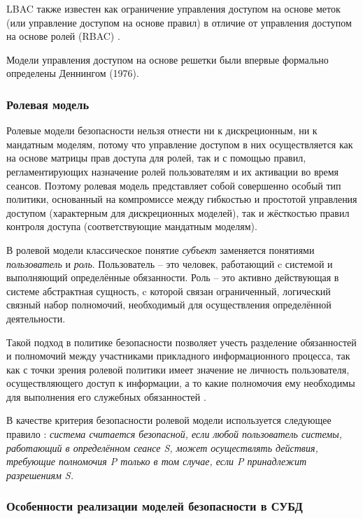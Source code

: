 {LBAC также известен как ограничение управления доступом на основе меток (или управление доступом на основе правил) 
в отличие от управления доступом на основе ролей (RBAC) \autocite{LBAC}.

Модели управления доступом на основе решетки были впервые формально определены Деннингом (1976).

\subsubsection{Ролевая модель}

Ролевые модели безопасности нельзя отнести ни к дискреционным, ни к мандатным моделям, потому что 
управление доступом в них осуществляется как на основе матрицы прав доступа для ролей, так и с помощью 
правил, регламентирующих назначение ролей пользователям и их активации во время сеансов. Поэтому 
ролевая модель представляет собой совершенно особый тип политики, основанный на компромиссе между 
гибкостью и простотой управления доступом (характерным для дискреционных моделей), так и жёсткостью 
правил контроля доступа (соответствующие мандатным моделям).

В ролевой модели классическое понятие \textit{субъект} заменяется понятиями \textit{пользователь} и 
\textit{роль}. Пользователь -- это человек, работающий c системой и выполняющий определённые 
обязанности. Роль -- это активно действующая в системе абстрактная сущность, c которой связан 
ограниченный, логический связный набор полномочий, необходимый для осуществления определённой деятельности.

Такой подход в политике безопасности позволяет учесть разделение обязанностей и полномочий между 
участниками прикладного информационного процесса, так как с точки зрения ролевой политики имеет 
значение не личность пользователя, осуществляющего доступ к информации, а то какие полномочия ему 
необходимы для выполнения его служебных обязанностей \autocite{Zegzhda}. 

В качестве критерия безопасности ролевой модели используется следующее правило \autocite{Zegzhda}: 
\textit{система считается безопасной, если любой пользователь системы, работающий в определённом 
сеансе S, может осуществлять действия, требующие полномочия P только в том случае, если P принадлежит 
разрешениям S.}

\subsubsection{Особенности реализации моделей безопасности в СУБД}

}

